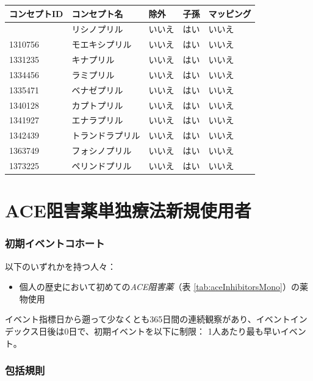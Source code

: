 \documentclass[
  11pt]{book}
\providecommand{\tightlist}{%
  \setlength{\itemsep}{0pt}\setlength{\parskip}{0pt}}
\theoremstyle{definition}
\theoremstyle{definition}
\theoremstyle{definition}
\theoremstyle{definition}
\theoremstyle{remark}
\begin{document}
\begin{longtable}[]{@{}lllll@{}}
\toprule\noalign{}
コンセプトID & コンセプト名 & 除外 & 子孫 & マッピング \\
\midrule\noalign{}
\endhead
\bottomrule\noalign{}
\endlastfoot
1308216 & リシノプリル & いいえ & はい & いいえ \\
1310756 & モエキシプリル & いいえ & はい & いいえ \\
1331235 & キナプリル & いいえ & はい & いいえ \\
1334456 & ラミプリル & いいえ & はい & いいえ \\
1335471 & ベナゼプリル & いいえ & はい & いいえ \\
1340128 & カプトプリル & いいえ & はい & いいえ \\
1341927 & エナラプリル & いいえ & はい & いいえ \\
1342439 & トランドラプリル & いいえ & はい & いいえ \\
1363749 & フォシノプリル & いいえ & はい & いいえ \\
1373225 & ペリンドプリル & いいえ & はい & いいえ \\
\end{longtable}

\section{ACE阻害薬単独療法新規使用者}\label{AceInhibitorsMono}

\subsubsection*{初期イベントコホート}\label{ux521dux671fux30a4ux30d9ux30f3ux30c8ux30b3ux30dbux30fcux30c8-1}

以下のいずれかを持つ人々：

\begin{itemize}
\tightlist
\item
  個人の歴史において初めての\emph{ACE阻害薬}（表 \ref{tab:aceInhibitorsMono}）の薬物使用
\end{itemize}

イベント指標日から遡って少なくとも365日間の連続観察があり、イベントインデックス日後は0日で、初期イベントを以下に制限： 1人あたり最も早いイベント。

\subsubsection*{包括規則}\label{ux5305ux62ecux898fux5247}
\end{document}
